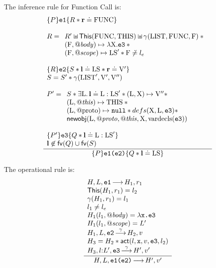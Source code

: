 \documentclass{article}
\begin{document}
The inference rule for Function Call is:
\[\frac
{  \begin{array}{l}
        \tr P {\js{e1}} {R \sep\rv\doteq \V{FUNC}}\\
  \\
  R = \begin{array}[t]{l}
          R' \sepish \pickThis(\V{FUNC},\V{THIS})\sepish \getValue(\V{LIST},\V{FUNC},\V{F}) \sep{}\\
          (\V{F},\bodyp)\pointsto \lambda\V{X}.\js{e3} \sep {}\\
          (\V{F},\fscopep)\pointsto\V{LS}'\sep\V{F}\not\doteq\lge
  \end{array}
        \\\\
  \tr R {\js{e2}} {S \sep \ls\doteq\V{LS}\sep\rv\doteq \LVAL'}\\
  S = S'\sep \getValue(\V{LIST}',\LVAL',\LVAL'')\\
  \\
  P' = %
    \begin{array}[t]{l} 
            S \sep \exists\V{L}\st \ls\doteq\V{L}:\V{LS}' \sep (\V{L},\V{X})\pointsto \LVAL'' \sep\\
            (\V{L},\thisp)\pointsto\V{THIS} \sep {} \\
            (\V{L},\text{@proto})\pointsto \nil  \sep defs(\V{X},\V{L},\js{e3})  \sep \\
            \newobj(\V{L}, \protop,\thisp, \V{X}, \text{vardecls}(\js{e3}))
    \end{array} 
  \\  \\
  \tr {P'} {\js{e3}} {Q \sep \ls\doteq\V{L}:\V{LS}'}\\
%
\ls\not\in \fv(Q)\cup \fv(S)
\end{array}
}
{\tr P {\js{e1(e2)}} {Q \sep\ls\doteq\V{LS}}}
\]

The operational rule is:
\[\frac
{\begin{array}{l}
        H,L,\mbox{\texttt{{\upshape e1}}} {\,\longrightarrow\,} H_1,r_1\\ 
 \mathsf{This}(H_1,r_1)=l_2\\
 \gamma(H_1,r_1)=l_1\\
 l_1\neq l_{e}\\
 H_1(l_1,\mathit{@body})=\lambda \mbox{\texttt{{\upshape x.e3}}}\\
 H_1(l_1,\mathit{@scope})= L'\\
 H_1,L,\mbox{\texttt{{\upshape e2}}} {\,{\overset{\gamma}{\longrightarrow}}\,} H_2,v\\
 H_3 = H_2\mathbin{*}\mathsf{act}(l,\mbox{\texttt{{\upshape x}}},v,\mbox{\texttt{{\upshape e3}}},l_2)\\
 H_3,l{:} L',\mbox{\texttt{{\upshape e3}}} {\,{\overset{\gamma}{\longrightarrow}}\,} H',v'
 \end{array}
}
{H,L,\mbox{\texttt{{\upshape e1(e2)}}} {\,\longrightarrow\,} H',v'}
\]
\end{document}
